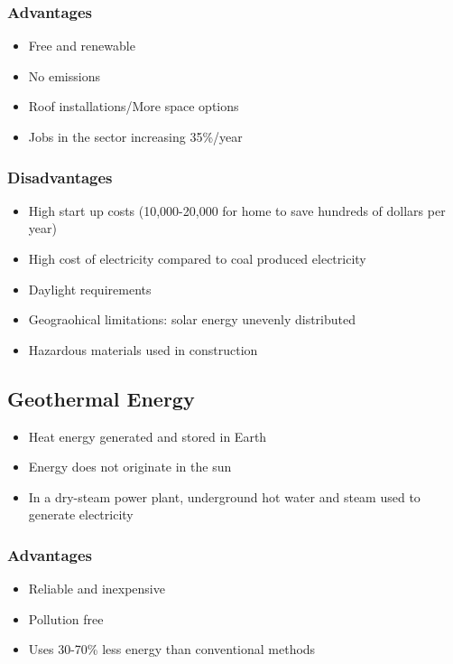 \documentclass[11pt]{article}
\begin{document}
\subsubsection{Advantages}
\label{sec:orgbb98fcc}
\begin{itemize}
\item Free and renewable
\item No emissions
\item Roof installations/More space options
\item Jobs in the sector increasing 35\%/year
\end{itemize}
\subsubsection{Disadvantages}
\label{sec:org2c79f29}
\begin{itemize}
\item High start up costs (10,000-20,000 for home to save hundreds of dollars per year)
\item High cost of electricity compared to coal produced electricity
\item Daylight requirements
\item Geograohical limitations: solar energy unevenly distributed
\item Hazardous materials used in construction
\end{itemize}
\subsection{Geothermal Energy}
\label{sec:org488d23e}
\begin{itemize}
\item Heat energy generated and stored in Earth
\item Energy does not originate in the sun
\item In a dry-steam power plant, underground hot water and steam used to generate electricity
\end{itemize}
\subsubsection{Advantages}
\label{sec:org6f234ed}
\begin{itemize}
\item Reliable and inexpensive
\item Pollution free
\item Uses 30-70\% less energy than conventional methods
\end{itemize}
\end{document}
